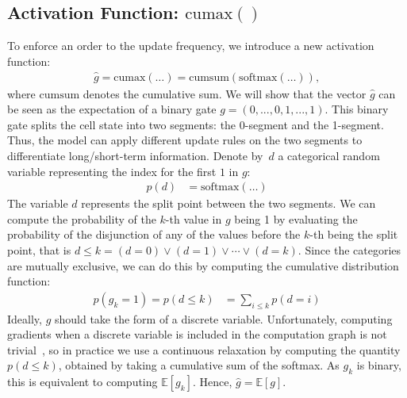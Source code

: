 \documentclass{article} \usepackage{iclr2019_conference,times}
\newcommand{\cumax}{\mathrm{cumax}}
\begin{document}
\subsection{Activation Function: $\cumax()$}
To enforce an order to the update frequency, we introduce a new activation function:
\begin{align}
    \hat{g} = \cumax (\ldots) = \mathrm{cumsum}(\mathrm{softmax}(\ldots)),
\end{align}
where $\mathrm{cumsum}$ denotes the cumulative sum.
We will show that the vector $\hat{g}$ can be seen as the expectation of a binary gate $g=(0,...,0,1,...,1)$. This binary gate splits the cell state into two segments: the 0-segment and the 1-segment. Thus, the model can apply different update rules on the two segments to differentiate long/short-term information. Denote by~$d$ a categorical random variable representing the index for the first $1$ in $g$:
\begin{align}
    p(d) &= \mathrm{softmax}(\ldots)
\end{align}
The variable $d$ represents the split point between the two segments. We can compute the probability of the $k$-th value in $g$ being 1 by evaluating the probability of the disjunction of any of the values before the $k$-th being the split point, that is $d \leq k = (d=0) \vee (d=1) \vee \cdots \vee (d=k)$. Since the categories are mutually exclusive, we can do this by computing the cumulative distribution function:
\begin{align}
    p(g_k=1) = p(d \leq k) &= \sum_{i \leq k} p(d = i)
\end{align}
Ideally, $g$ should take the form of a discrete variable.
Unfortunately, computing gradients when a discrete variable is included in the computation graph is not trivial~\citep{schulman2015gradient}, so in practice we use a continuous relaxation by computing the quantity $p(d \leq k)$, obtained by taking a cumulative sum of the softmax.
As $g_k$ is binary, this is equivalent to computing $\mathbb{E}[g_k]$. Hence, $\hat{g} = \mathbb{E}[g]$. 
\end{document}

